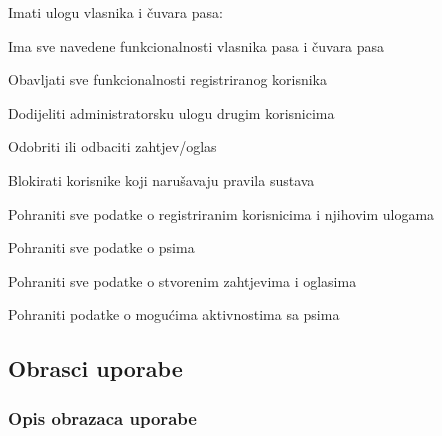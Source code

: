 \begin{packed_enum}
\begin{packed_enum}
\begin{packed_enum}
					\end{packed_enum}
					\item Imati ulogu vlasnika i čuvara pasa:
					\begin{packed_enum}
						\item Ima sve navedene funkcionalnosti vlasnika pasa i čuvara pasa
					\end{packed_enum}
				\end{packed_enum}
			
				\item {}
				\begin{packed_enum}
					\item Obavljati sve funkcionalnosti registriranog korisnika
					\item Dodijeliti administratorsku ulogu drugim korisnicima
					\item Odobriti ili odbaciti zahtjev/oglas
					\item Blokirati korisnike koji narušavaju pravila sustava
				\end{packed_enum}
			
				\item {}
				\begin{packed_enum}
					\item Pohraniti sve podatke o registriranim korisnicima i njihovim ulogama
					\item Pohraniti sve podatke o psima
					\item Pohraniti sve podatke o stvorenim zahtjevima i oglasima
					\item Pohraniti podatke o mogućima aktivnostima sa psima
				\end{packed_enum}
			
			\end{packed_enum}
			
			\eject 
			
			
				
			\subsection{Obrasci uporabe}
				
				\subsubsection{Opis obrazaca uporabe}					

